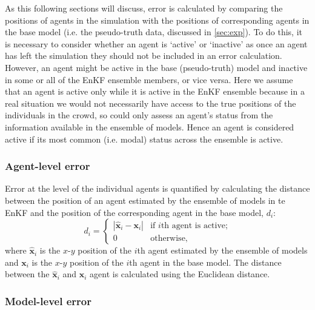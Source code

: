 \documentclass{article}
\begin{document}
As this following sections will discuss, error is calculated by comparing the positions of agents in the simulation with the positions of corresponding agents in the base model (i.e. the pseudo-truth data, discussed in \ref{sec:exp}). To do this, it is necessary to consider whether an agent is `active' 
or `inactive' as once an agent has left the simulation they should not be included in an error calculation. However, an agent might be active in the base (pseudo-truth) model and inactive in some or all of the EnKF ensemble members, or vice versa.  
Here we assume that an agent is active only while it is active in the EnKF ensemble  because in a real situation we would not necessarily have access to the true positions of the individuals in the crowd, so could only assess an agent's status from the information available in the ensemble of models. Hence an agent is considered active if its most common (i.e. modal) status across the ensemble is active.

\subsubsection{Agent-level error}

Error at the level of the individual agents is quantified by calculating the distance between the position of an agent estimated by the ensemble of models in te EnKF and the position of the corresponding agent in the base model, $d_i$:
\begin{equation}
    d_i = 
    \begin{cases}
        | \hat{\mathbf{x}}_i - \mathbf{x}_i | & \text{if $i$th agent is
        active;}\\
        0 & \text{otherwise,}
    \end{cases}
\end{equation}
where $\hat{\mathbf{x}}_i$ is the $x$-$y$ position of the $i$th agent estimated by the ensemble of models and $\mathbf{x}_i$ is the $x$-$y$ position of the $i$th agent in the base model. The distance between the $\hat{\mathbf{x}}_i$ and $\mathbf{x}_i$ agent is calculated using the Euclidean distance.

\subsubsection{Model-level error}
\end{document}

